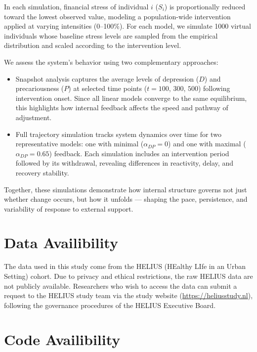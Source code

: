 \documentclass[
]{article}
\begin{document}
In each simulation, financial stress of individual \(i\) (\(S_i\)) is
proportionally reduced toward the lowest observed value, modeling a
population-wide intervention applied at varying intensities (0--100\%).
For each model, we simulate 1000 virtual individuals whose baseline
stress levels are sampled from the empirical distribution and scaled
according to the intervention level.

We assess the system's behavior using two complementary approaches:

\begin{itemize}
\item
  Snapshot analysis captures the average levels of depression (\(D\))
  and precariousness (\(P\)) at selected time points (\(t = 100\),
  \(300\), \(500\)) following intervention onset. Since all linear
  models converge to the same equilibrium, this highlights how internal
  feedback affects the speed and pathway of adjustment.
\item
  Full trajectory simulation tracks system dynamics over time for two
  representative models: one with minimal (\(\alpha_{DP} = 0\)) and one
  with maximal (\(\alpha_{DP} = 0.65\)) feedback. Each simulation
  includes an intervention period followed by its withdrawal, revealing
  differences in reactivity, delay, and recovery stability.
\end{itemize}

Together, these simulations demonstrate how internal structure governs
not just whether change occurs, but how it unfolds --- shaping the pace,
persistence, and variability of response to external support.

\section{Data Availibility}\label{data-availibility}

The data used in this study come from the HELIUS (HEalthy LIfe in an
Urban Setting) cohort. Due to privacy and ethical restrictions, the raw
HELIUS data are not publicly available. Researchers who wish to access
the data can submit a request to the HELIUS study team via the study
website (\url{https://heliusstudy.nl}), following the governance
procedures of the HELIUS Executive Board.

\section{Code Availibility}\label{code-availibility}
\end{document}

